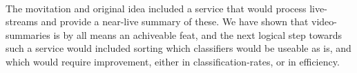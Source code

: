 \\
%
The movitation and original idea included a service that would process live-streams and provide a near-live summary of these. We have shown that video-summaries is by all means an achiveable feat, and the next logical step towards such a service would included sorting which classifiers would be useable as is, and which would require improvement, either in classification-rates, or in efficiency. %
%